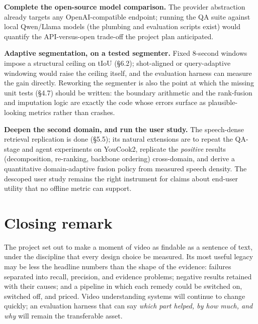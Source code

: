 \textbf{Complete the open-source model comparison.} The provider
abstraction already targets any OpenAI-compatible endpoint; running the
QA suite against local Qwen/Llama models (the plumbing and evaluation
scripts exist) would quantify the API-versus-open trade-off the project
plan anticipated.

\textbf{Adaptive segmentation, on a tested segmenter.} Fixed 8-second
windows impose a structural ceiling on tIoU (§6.2); shot-aligned or
query-adaptive windowing would raise the ceiling itself, and the
evaluation harness can measure the gain directly. Reworking the
segmenter is also the point at which the missing unit tests (§4.7)
should be written: the boundary arithmetic and the rank-fusion and
imputation logic are exactly the code whose errors surface as
plausible-looking metrics rather than crashes.

\textbf{Deepen the second domain, and run the user study.} The
speech-dense retrieval replication is done (§5.5); its natural
extensions are to repeat the QA-stage and agent experiments on YouCook2,
replicate the \emph{positive} results (decomposition, re-ranking,
backbone ordering) cross-domain, and derive a quantitative
domain-adaptive fusion policy from measured speech density. The descoped
user study remains the right instrument for claims about end-user
utility that no offline metric can support.

\section{Closing remark}

The project set out to make a moment of video as findable as a sentence
of text, under the discipline that every design choice be measured. Its
most useful legacy may be less the headline numbers than the shape of
the evidence: failures separated into recall, precision, and evidence
problems; negative results retained with their causes; and a pipeline in
which each remedy could be switched on, switched off, and priced. Video
understanding systems will continue to change quickly; an evaluation
harness that can say \emph{which part helped, by how much, and why} will
remain the transferable asset.
